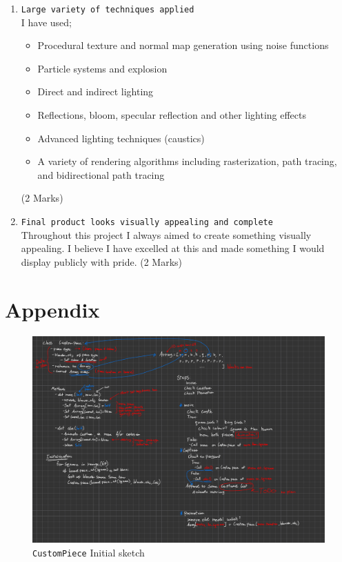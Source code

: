 \documentclass[11pt]{article}
\begin{document}
\begin{enumerate}
I have delved into the source of Blender to find methods and algorithms used
where I found documentation to be lacking. I found, read, and cited original
papers detailing \texttt{GGX, MSGGX, Christensen-Burley model, and Random walk
    model}. (2 Marks)
\item \texttt{Large variety of techniques applied}\\
I have used;
\begin{itemize}
\item Procedural texture and normal map generation using noise functions
\item Particle systems and explosion
\item Direct and indirect lighting
\item Reflections, bloom, specular reflection and other lighting effects
\item Advanced lighting techniques (caustics)
\item A variety of rendering algorithms including rasterization, path tracing,
and bidirectional path tracing
\end{itemize}
(2 Marks)
\item \texttt{Final product looks visually appealing and complete}\\
Throughout this project I always aimed to create something visually appealing.
I believe I have excelled at this and made something I would display
publicly with pride. (2 Marks)
\end{enumerate}

\newpage
\section{Appendix}
\label{sec:org17f7b2d}
\begin{figure}[htbp]
\centering
\includegraphics[width=\textwidth]{Scratchpad.pdf}
\caption{\label{class-sketch}\texttt{CustomPiece} Initial sketch}
\end{figure}
\end{document}
